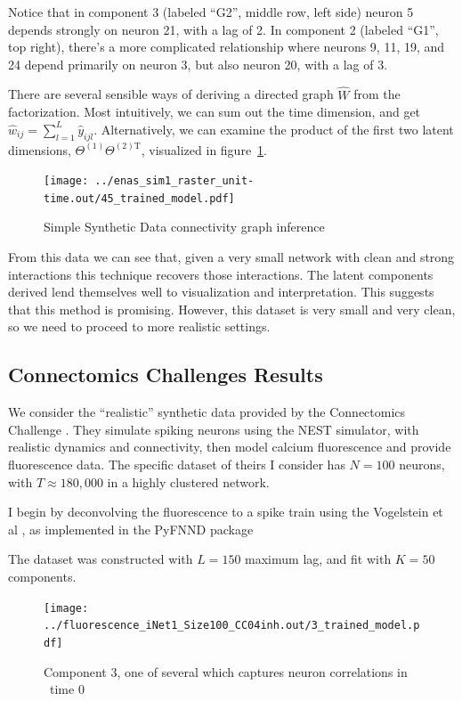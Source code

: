 \documentclass{article}
\begin{document}
Notice that in component 3 (labeled ``G2'', middle row, left side) neuron 5 depends strongly on neuron 21, with a lag of 2. In component 2 (labeled ``G1'', top right), there's a more complicated relationship where neurons 9, 11, 19, and 24 depend primarily on neuron 3, but also neuron 20, with a lag of 3. 

There are several sensible ways of deriving a directed graph $\hat{W}$ from the factorization. Most intuitively, we can sum out the time dimension, and get $\hat{w}_{ij} = \sum_{l=1}^L \hat{y}_{ijl}$. Alternatively, we can examine the product of the first two latent dimensions, $\Theta^{(1)} \Theta^{(2)\textrm{T}}$, visualized in figure~\ref{fig:dot_product}. 

\begin{figure}[!h]
	\centering
	\texttt{[image: ../enas\_sim1\_raster\_unit-time.out/45\_trained\_model.pdf]}
	\caption{Simple Synthetic Data connectivity graph inference}
	\label{fig:dot_product}
\end{figure}

From this data we can see that, given a very small network with clean and strong interactions this technique recovers those interactions. The latent components derived lend themselves well to visualization and interpretation. This suggests that this method is promising. However, this dataset is very small and very clean, so we need to proceed to more realistic settings. 


\subsection{Connectomics Challenges Results}
\label{sec:connectomics}
We consider the ``realistic'' synthetic data provided by the Connectomics Challenge \cite{stetter2012model}. They simulate spiking neurons using the NEST simulator\cite{Gewaltig:NEST}, with realistic dynamics and connectivity, then model calcium fluorescence and provide fluorescence data. The specific dataset of theirs I consider has $N=100$ neurons, with $T\approx 180,000$ in a highly clustered network.

I begin by deconvolving the fluorescence to a spike train using the Vogelstein et al , as implemented in the PyFNND package \cite{vogelstein2010fast,pyfnnd}

The dataset was constructed with $L=150$ maximum lag, and fit with $K=50$ components.

\begin{figure}[!h]
\centering
\texttt{[image: ../fluorescence\_iNet1\_Size100\_CC04inh.out/3\_trained\_model.pdf]}
\caption{Component 3, one of several which captures neuron correlations in ~time 0}
\end{figure}
\end{document}

